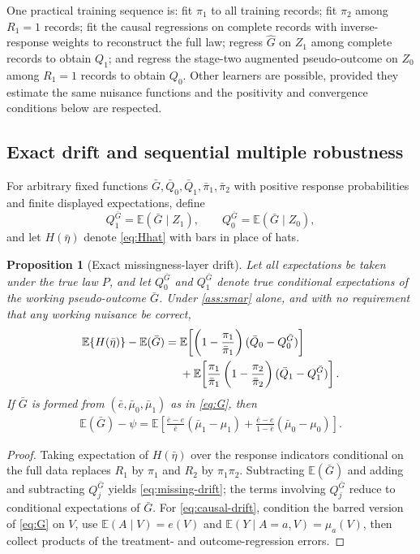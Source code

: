 \documentclass[11pt]{article}
\newtheorem{proposition}{Proposition}
\theoremstyle{definition}
\newcommand{\E}{\mathbb{E}}
\newcommand{\1}{\mathbf{1}}
\begin{document}
One practical training sequence is: fit $\pi_1$ to all training records; fit $\pi_2$ among $R_1=1$ records; fit the causal regressions on complete records with inverse-response weights to reconstruct the full law; regress $\widehat G$ on $Z_1$ among complete records to obtain $Q_1$; and regress the stage-two augmented pseudo-outcome on $Z_0$ among $R_1=1$ records to obtain $Q_0$. Other learners are possible, provided they estimate the same nuisance functions and the positivity and convergence conditions below are respected.

\subsection{Exact drift and sequential multiple robustness}

For arbitrary fixed functions $\bar G,\bar Q_0,\bar Q_1,\bar\pi_1,\bar\pi_2$ with positive response probabilities and finite displayed expectations, define
\[
Q_1^{\bar G}=\E(\bar G\mid Z_1),\qquad
Q_0^{\bar G}=\E(\bar G\mid Z_0),
\]
and let $H(\bar\eta)$ denote \cref{eq:Hhat} with bars in place of hats.

\begin{proposition}[Exact missingness-layer drift]\label{prop:drift}
Let all expectations be taken under the true law $P$, and let $Q_0^{\bar G}$ and
$Q_1^{\bar G}$ denote true conditional expectations of the working pseudo-outcome
$\bar G$. Under \cref{ass:smar} alone, and with no requirement that any working
nuisance be correct,
\begin{align}
\E\{H(\bar\eta)\}-\E(\bar G)
={}&\E\!\left[\left(1-\frac{\pi_1}{\bar\pi_1}\right)
(\bar Q_0-Q_0^{\bar G})\right]\notag\\
&+\E\!\left[\frac{\pi_1}{\bar\pi_1}
\left(1-\frac{\pi_2}{\bar\pi_2}\right)
(\bar Q_1-Q_1^{\bar G})\right].
\label{eq:missing-drift}
\end{align}
If $\bar G$ is formed from $(\bar e,\bar\mu_0,\bar\mu_1)$ as in \cref{eq:G}, then
\begin{align}
\E(\bar G)-\psi
=\E\!\left[
\frac{\bar e-e}{\bar e}(\bar\mu_1-\mu_1)
+\frac{\bar e-e}{1-\bar e}(\bar\mu_0-\mu_0)
\right].
\label{eq:causal-drift}
\end{align}
\end{proposition}

\begin{proof}
Taking expectation of $H(\bar\eta)$ over the response indicators conditional on the full data replaces $R_1$ by $\pi_1$ and $R_2$ by $\pi_1\pi_2$. Subtracting $\E(\bar G)$ and adding and subtracting $Q_j^{\bar G}$ yields \cref{eq:missing-drift}; the terms involving $Q_j^{\bar G}$ reduce to conditional expectations of $\bar G$. For \cref{eq:causal-drift}, condition the barred version of \cref{eq:G} on $V$, use $\E(A\mid V)=e(V)$ and $\E(Y\mid A=a,V)=\mu_a(V)$, then collect products of the treatment- and outcome-regression errors.
\end{proof}
\end{document}
